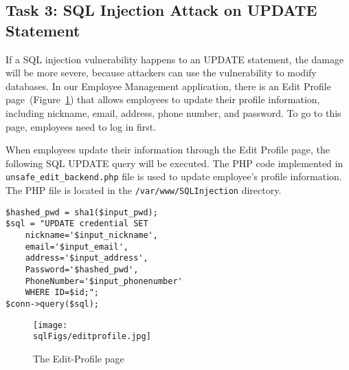 \begin{itemize}

\end{itemize}



\subsection{Task 3: SQL Injection Attack on UPDATE Statement} 

If a SQL injection vulnerability happens to an UPDATE statement, the damage will be more
severe, because attackers can use the vulnerability to modify databases. 
In our Employee Management application, there is an Edit Profile page~(Figure~\ref{sql:fig:edit}) 
that allows employees to
update their profile information, including nickname, email, address, phone number, and
password. To go to this page, employees need to log in first. 


When employees update their information through the Edit Profile page, the
following SQL UPDATE query will be executed. The PHP code implemented in
{\tt unsafe\_edit\_backend.php} file is used to update employee's profile
information. The PHP file is located in the {\tt /var/www/SQLInjection}
directory.


\begin{lstlisting}
$hashed_pwd = sha1($input_pwd);
$sql = "UPDATE credential SET
	nickname='$input_nickname',
	email='$input_email',
	address='$input_address',
	Password='$hashed_pwd',
	PhoneNumber='$input_phonenumber'
	WHERE ID=$id;";
$conn->query($sql);
\end{lstlisting}
 

\begin{figure}[htb]
\begin{center}
  \texttt{[image: \\sqlFigs/editprofile.jpg]}
\end{center}
\caption{The Edit-Profile page}
\label{sql:fig:edit}
\end{figure}
 


